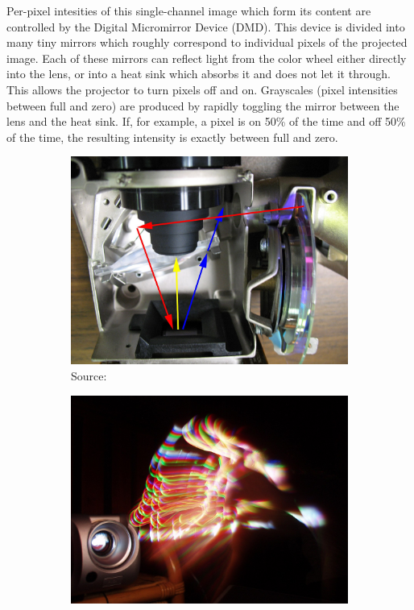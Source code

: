 Per-pixel intesities of this single-channel image which form its content are controlled by the Digital Micromirror Device (DMD). This device is divided into many tiny mirrors which roughly correspond to individual pixels of the projected image. Each of these mirrors can reflect light from the color wheel either directly into the lens, or into a heat sink which absorbs it and does not let it through. This allows the projector to turn pixels off and on. Grayscales (pixel intensities between full and zero) are produced by rapidly toggling the mirror between the lens and the heat sink. If, for example, a pixel is on 50\% of the time and off 50\% of the time, the resulting intensity is exactly between full and zero.

\begin{figure}[ht]
    \centering
    \begin{subfigure}[b]{0.49\textwidth}
        \centering
        \includegraphics[width=\textwidth]{images/02-projector_dlp.jpg}
        \caption{Source: \citet{ImageProjectorDLP}}
    \end{subfigure}
    \hfill
    \begin{subfigure}[b]{0.49\textwidth}
        \centering
        \includegraphics[width=\textwidth]{images/02-projector_rainbow.JPG}

\end{subfigure}
\end{figure}
